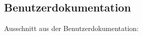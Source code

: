 \subsection{Benutzerdokumentation}
\label{app:BenutzerDoku}
Ausschnitt aus der Benutzerdokumentation:

